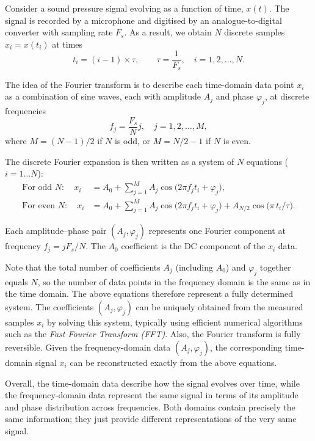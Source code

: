 \documentclass[12pt,a4paper]{article}
\begin{document}
Consider a sound pressure signal evolving as a function of time, $x(t)$. The signal is recorded by a microphone and digitised by an analogue-to-digital converter with sampling rate \(F_s\). As a result, we obtain $N$ discrete samples $x_i = x(t_i)$ at times
\[
t_i = (i-1) \times \tau, \qquad \tau = \frac{1}{F_s}, \quad i = 1, 2, \ldots, N.
\]

The idea of the Fourier transform is to describe each time-domain data point \(x_i\)
as a combination of sine waves, each with amplitude \(A_j\) and phase \(\varphi_j\),
at discrete frequencies
\[
f_j = \frac{F_s}{N}j, \quad j = 1, 2, \ldots, M,
\]
where \(M = (N - 1)/2\) if \(N\) is odd, or \(M = N/2 - 1\) if \(N\) is even.

The discrete Fourier expansion is then written as a system of $N$ equations ($i = 1\ldots N$):
\begin{align}
\text{For odd } N:\quad
x_i &= A_0 + \sum_{j=1}^{M} A_j \cos\!\big(2\pi f_j t_i + \varphi_j\big), \\[6pt]
\text{For even } N:\quad
x_i &= A_0 + \sum_{j=1}^{M} A_j \cos\!\big(2\pi f_j t_i + \varphi_j\big)
      + A_{N/2}\cos\!\big(\pi\, t_i / \tau\big).
\end{align}

Each amplitude–phase pair \((A_j, \varphi_j)\) represents one Fourier component at frequency \(f_j = jF_s/N\). The $A_0$ coefficient is the DC component of the $x_i$ data.

Note that the total number of coefficients $A_j$ (including $A_0$) and $\varphi_j$ together equals \(N\), so the number of data points in the frequency domain is the same as in the time domain. The above equations therefore represent a fully determined system. The coefficients \((A_j, \varphi_j)\) can be uniquely obtained from the measured samples \(x_i\) by solving this system, typically using efficient numerical algorithms such as the \emph{Fast Fourier Transform (FFT)}. Also, the Fourier transform is fully reversible. Given the frequency-domain data \((A_j, \varphi_j)\), the corresponding time-domain signal \(x_i\) can be reconstructed exactly from the above equations.  

Overall, the time-domain data describe how the signal evolves over time, while the frequency-domain data represent the same signal in terms of its amplitude and phase distribution across frequencies. Both domains contain precisely the same information; they just provide different representations of the very same signal.
\end{document}
